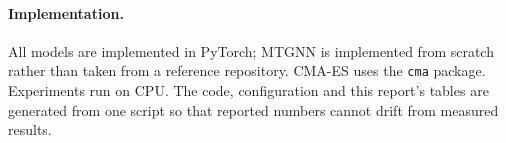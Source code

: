 \paragraph{Implementation.} All models are implemented in PyTorch; MTGNN is implemented from scratch rather than taken from a reference repository. CMA-ES uses the \texttt{cma} package. Experiments run on CPU. The code, configuration and this report's tables are generated from one script so that reported numbers cannot drift from measured results.
